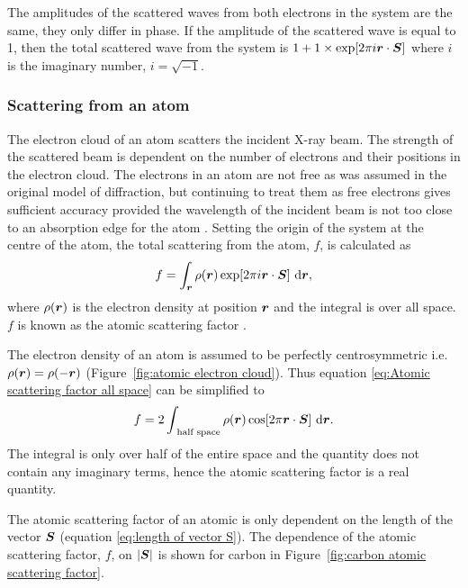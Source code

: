             The amplitudes of the scattered waves from both electrons in the system are the same, they only differ in phase.
            If the amplitude of the scattered wave is equal to 1, then the total scattered wave from the system is $1 + 1 \times \exp[2 \pi i \boldsymbol{r} \cdot \boldsymbol{S}]$ where $i$ is the imaginary number, $i = \sqrt{-1}$.

        \subsubsection{Scattering from an atom}
        \label{subs:Scattering from an atom}
            The electron cloud of an atom scatters the incident X-ray beam.
            The strength of the scattered beam is dependent on the number of electrons and their positions in the electron cloud.
            The electrons in an atom are not free as was assumed in the original model of diffraction, but continuing to treat them as free electrons gives sufficient accuracy provided the wavelength of the incident beam is not too close to an absorption edge for the atom \cite{drenth2012}.
            Setting the origin of the system at the centre of the atom, the total scattering from the atom, $f$, is calculated as
            \begin{equation}
                f = \int_{\boldsymbol{r}} \rho(\boldsymbol{r}) \exp[2 \pi i \boldsymbol{r} \cdot \boldsymbol{S}]\ \mathrm{d}\boldsymbol{r},
                \label{eq:Atomic scattering factor all space}
            \end{equation}
            where $\rho(\boldsymbol{r})$ is the electron density at position $\boldsymbol{r}$ and the integral is over all space. $f$ is known as the atomic scattering factor \cite{drenth1999}.

            The electron density of an atom is assumed to be perfectly centrosymmetric i.e. $\rho(\boldsymbol{r}) = \rho(-\boldsymbol{r})$ (Figure~\ref{fig:atomic electron cloud}).
            Thus equation \ref{eq:Atomic scattering factor all space} can be simplified to
            \begin{equation}
                f = 2 \int_{\text{ half space}} \rho(\boldsymbol{r}) \cos[2 \pi \boldsymbol{r} \cdot \boldsymbol{S}]\ \mathrm{d}\boldsymbol{r}.
            \end{equation}
            The integral is only over half of the entire space and the quantity does not contain any imaginary terms, hence the atomic scattering factor is a real quantity.

            The atomic scattering factor of an atomic is only dependent on the length of the vector $\boldsymbol{S}$ (equation \ref{eq:length of vector S}).
            The dependence of the atomic scattering factor, $f$, on $|\boldsymbol{S}|$ is shown for carbon in Figure~\ref{fig:carbon atomic scattering factor}.

